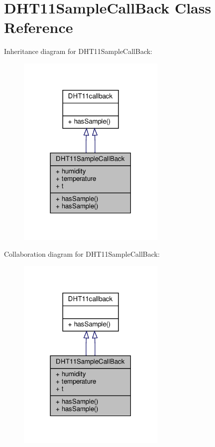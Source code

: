 \hypertarget{classDHT11SampleCallBack}{}\section{D\+H\+T11\+Sample\+Call\+Back Class Reference}
\label{classDHT11SampleCallBack}


Inheritance diagram for D\+H\+T11\+Sample\+Call\+Back\+:
\nopagebreak
\begin{figure}[H]
\begin{center}
\leavevmode
\includegraphics[width=201pt]{classDHT11SampleCallBack__inherit__graph}
\end{center}
\end{figure}


Collaboration diagram for D\+H\+T11\+Sample\+Call\+Back\+:
\nopagebreak
\begin{figure}[H]
\begin{center}
\leavevmode
\includegraphics[width=201pt]{classDHT11SampleCallBack__coll__graph}
\end{center}
\end{figure}
